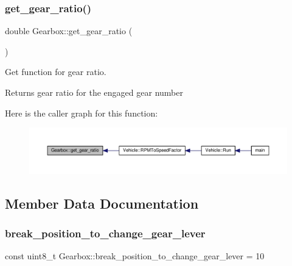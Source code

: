\subsubsection{\texorpdfstring{get\+\_\+gear\+\_\+ratio()}{get\_gear\_ratio()}}
{\footnotesize\ttfamily double Gearbox\+::get\+\_\+gear\+\_\+ratio (\begin{DoxyParamCaption}{ }\end{DoxyParamCaption})}

Get function for gear ratio. \begin{DoxyReturn}{Returns}
gear ratio for the engaged gear number 
\end{DoxyReturn}
Here is the caller graph for this function\+:
\nopagebreak
\begin{figure}[H]
\begin{center}
\leavevmode
\includegraphics[width=350pt]{classGearbox_ad53da0be7891d702873f2a97e0f49c3a_icgraph}
\end{center}
\end{figure}


\subsection{Member Data Documentation}
\mbox{\label{classGearbox_a3b7708c5a08bc9758a5317e59dbea5c9}} 
\subsubsection{\texorpdfstring{break\+\_\+position\+\_\+to\+\_\+change\+\_\+gear\+\_\+lever}{break\_position\_to\_change\_gear\_lever}}
{\footnotesize\ttfamily const uint8\+\_\+t Gearbox\+::break\+\_\+position\+\_\+to\+\_\+change\+\_\+gear\+\_\+lever = 10\hspace{0.3cm}{\ttfamily [private]}}

\mbox{\label{classGearbox_a1fb7a1973d59b2af8bfd43138c10a087}} 
